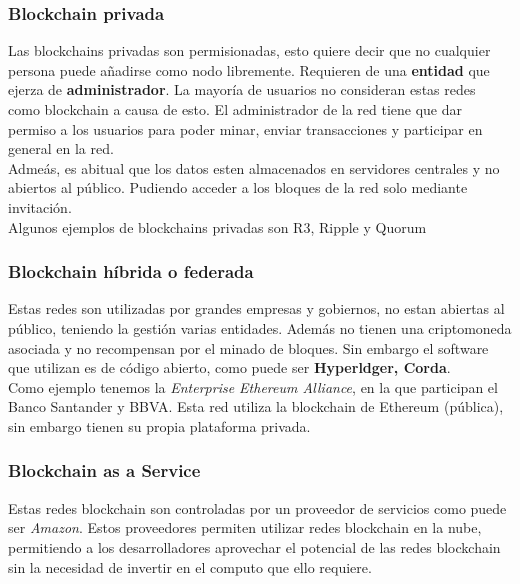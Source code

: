 \subsubsection{Blockchain privada}

Las blockchains privadas son permisionadas, esto quiere decir que no cualquier persona puede añadirse como nodo libremente. Requieren de una \textbf{entidad} que ejerza de \textbf{administrador}. La mayoría de usuarios no consideran estas redes como blockchain a causa de esto. El administrador de la red tiene que dar permiso a los usuarios para poder minar, enviar transacciones y participar en general en la red. \\

Admeás, es abitual que los datos esten almacenados en servidores centrales y no abiertos al público. Pudiendo acceder a los bloques de la red solo mediante invitación. \\

Algunos ejemplos de blockchains privadas son R3\cite{webR3}, Ripple\cite{webRipple} y Quorum\cite{webQuorum}

\subsubsection{Blockchain híbrida o federada}

Estas redes son utilizadas por grandes empresas y gobiernos, no estan abiertas al público, teniendo la gestión varias entidades. Además no tienen una criptomoneda asociada y no recompensan por el minado de bloques. Sin embargo el software que utilizan es de código abierto, como puede ser \textbf{Hyperldger, Corda}\cite{webHyper, webCorda}. \\

Como ejemplo tenemos la \emph{Enterprise Ethereum Alliance}, en la que participan el Banco Santander y BBVA. Esta red utiliza la blockchain de Ethereum (pública), sin embargo tienen su propia plataforma privada.

\subsubsection{Blockchain as a Service}

Estas redes blockchain son controladas por un proveedor de servicios como puede ser \emph{Amazon}. Estos proveedores permiten utilizar redes blockchain en la nube, permitiendo a los desarrolladores aprovechar el potencial de las redes blockchain sin la necesidad de invertir en el computo que ello requiere.

